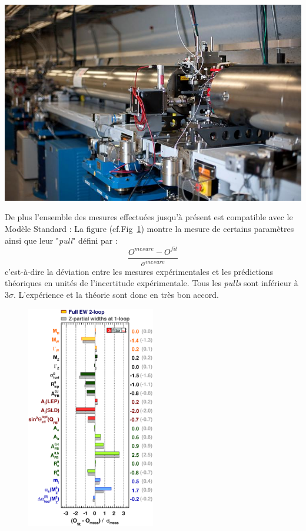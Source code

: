 \marginpar
{
	\centering
	\includegraphics[width=\marginparwidth]{SM/slac.jpg}
	\label{SLAC}
}

De plus l'ensemble des mesures effectuées jusqu'à présent est compatible avec le Modèle Standard : La figure (cf.Fig~\ref{mesures}) montre la mesure de certains paramètres ainsi que leur "\textit{pull}" défini par :
\begin{equation}
\frac{O^{mesure}-O^{fit}}{\sigma^{mesure}}
\end{equation}
c'est-à-dire la déviation entre les mesures expérimentales et les prédictions théoriques en unités de l'incertitude expérimentale. Tous les \textit{pulls} sont inférieur à \num{3}$\sigma$. L'expérience et la théorie sont donc en très bon accord.

\begin{figure}[ht!]
\centering
\includegraphics[width=0.50\textwidth]{SM/mesure.eps}
\label{mesures}
\end{figure}

